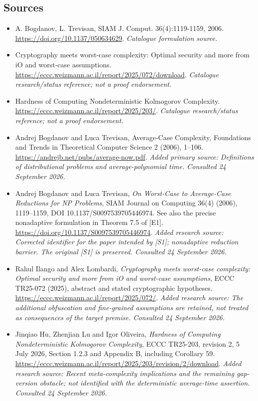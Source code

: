 \documentclass[11pt]{article}
\begin{document}
\subsection{Sources}
\begin{itemize}\raggedright
\item[\textnormal{[S1]}]\hypertarget{source:30006698:1}{} A. Bogdanov, L. Trevisan, SIAM J. Comput. 36(4):1119-1159, 2006.
\url{https://doi.org/10.1137/050634629}.
{\small\textit{Catalogue formulation source.}}
\item[\textnormal{[S2]}]\hypertarget{source:30006698:2}{} Cryptography meets worst-case complexity: Optimal security and more from iO and worst-case assumptions.
\url{https://eccc.weizmann.ac.il/report/2025/072/download}.
{\small\textit{Catalogue research/status reference; not a proof endorsement.}}
\item[\textnormal{[S3]}]\hypertarget{source:30006698:3}{} Hardness of Computing Nondeterministic Kolmogorov Complexity.
\url{https://eccc.weizmann.ac.il/report/2025/203/}.
{\small\textit{Catalogue research/status reference; not a proof endorsement.}}
\item[\textnormal{[E1]}]\hypertarget{extra:30006698:1}{} Andrej Bogdanov and Luca Trevisan, Average-Case Complexity, Foundations and Trends in Theoretical Computer Science 2 (2006), 1--106.
\url{https://andrejb.net/pubs/average-now.pdf}.
{\small\textit{Added primary source: Definitions of distributional problems and average-polynomial time. Consulted 24 September 2026.}}
\item[\textnormal{[E2]}]\hypertarget{extra:30006698:2}{} Andrej Bogdanov and Luca Trevisan, \emph{On Worst-Case to Average-Case Reductions for NP Problems}, SIAM Journal on Computing 36(4) (2006), 1119--1159, DOI 10.1137/S0097539705446974. See also the precise nonadaptive formulation in Theorem 7.5 of [E1].
\url{https://doi.org/10.1137/S0097539705446974}.
{\small\textit{Added research source: Corrected identifier for the paper intended by [S1]; nonadaptive reduction barrier. The original [S1] is preserved. Consulted 24 September 2026.}}
\item[\textnormal{[E3]}]\hypertarget{extra:30006698:3}{} Rahul Ilango and Alex Lombardi, \emph{Cryptography meets worst-case complexity: Optimal security and more from iO and worst-case assumptions}, ECCC TR25-072 (2025), abstract and stated cryptographic hypotheses.
\url{https://eccc.weizmann.ac.il/report/2025/072/}.
{\small\textit{Added research source: The additional obfuscation and fine-grained assumptions are retained, not treated as consequences of the target premise. Consulted 24 September 2026.}}
\item[\textnormal{[E4]}]\hypertarget{extra:30006698:4}{} Jinqiao Hu, Zhenjian Lu and Igor Oliveira, \emph{Hardness of Computing Nondeterministic Kolmogorov Complexity}, ECCC TR25-203, revision 2, 5 July 2026, Section 1.2.3 and Appendix B, including Corollary 59.
\url{https://eccc.weizmann.ac.il/report/2025/203/revision/2/download}.
{\small\textit{Added research source: Recent meta-complexity implications and the remaining gap-version obstacle; not identified with the deterministic average-time assertion. Consulted 24 September 2026.}}
\end{itemize}
\end{document}
